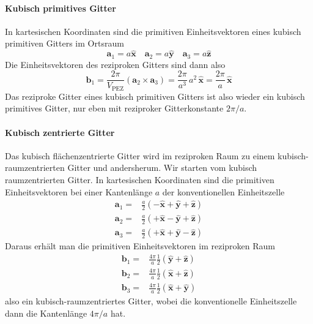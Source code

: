 \paragraph{Kubisch primitives Gitter} In kartesischen Koordinaten sind die primitiven Einheitsvektoren eines kubisch primitiven Gitters im Ortsraum
\begin{equation}
 \mathbf{a}_1 = a \hat{\mathbf{x}} \quad \mathbf{a}_2 = a \hat{\mathbf{y}}
 \quad \mathbf{a}_3 = a \hat{\mathbf{z}}
\end{equation}
Die Einheitsvektoren des reziproken Gitters sind dann also
\begin{equation}
  \mathbf{b}_1 = \frac{2 \pi}{V_\text{PEZ}} \left(  \mathbf{a}_2 \times \mathbf{a}_3 \right)  = \frac{2 \pi}{a^3} \, a^2  \, \hat{\mathbf{x}} = \frac{2 \pi}{a}  \, \hat{\mathbf{x}} 
\end{equation}
Das reziproke Gitter eines kubisch primitiven Gitters ist also wieder ein kubisch primitives Gitter, nur eben mit reziproker Gitterkonstante $2 \pi / a$.


\paragraph{Kubisch zentrierte  Gitter} Das kubisch flächenzentrierte Gitter wird im reziproken Raum zu einem kubisch-raumzentrierten Gitter und andersherum. Wir starten vom kubisch raumzentrierten Gitter. In kartesischen Koordinaten sind die primitiven Einheitsvektoren bei einer Kantenlänge $a$ der konventionellen Einheitszelle
\begin{align}
 \mathbf{a}_1 = & \frac{a}{2} \left( - \hat{\mathbf{x}} + \hat{\mathbf{y}} +\hat{\mathbf{z}} \right) \\
  \mathbf{a}_2 = & \frac{a}{2} \left( + \hat{\mathbf{x}} - \hat{\mathbf{y}} +\hat{\mathbf{z}} \right) \\
   \mathbf{a}_3 = & \frac{a}{2} \left( + \hat{\mathbf{x}} + \hat{\mathbf{y}} - \hat{\mathbf{z}} \right) 
\end{align}
Daraus erhält man die primitiven Einheitsvektoren im reziproken Raum
\begin{align}
\mathbf{b}_1 = & \frac{4\pi}{a} \frac{1}{2} \left( \hat{\mathbf{y}} + \hat{\mathbf{z}}  \right) \\
\mathbf{b}_2 = & \frac{4\pi}{a} \frac{1}{2} \left( \hat{\mathbf{x}} + \hat{\mathbf{z}}  \right) \\
\mathbf{b}_3 = & \frac{4\pi}{a} \frac{1}{2} \left( \hat{\mathbf{x}} + \hat{\mathbf{y}}  \right) 
\end{align}
also ein kubisch-raumzentriertes Gitter, wobei die konventionelle Einheitszelle dann die Kantenlänge $4 \pi / a$ hat.


